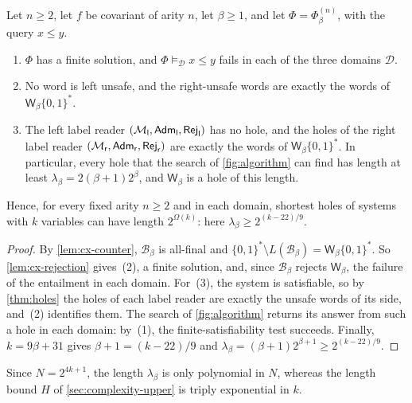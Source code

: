 \begin{proposition}\label{prop:cx-length}
Let $n\ge2$, let $f$ be covariant of arity $n$, let $\beta\ge1$, and let
$\Phi=\Phi_\beta^{(n)}$, with the query $x\le y$.
\begin{enumerate}[leftmargin=*]
\item $\Phi$ has a finite solution, and $\Phi\models_{\mathcal D}x\le y$ fails
  in each of the three domains $\mathcal D$.
\item No word is left unsafe, and the right-unsafe words are exactly the
  words of $\mathsf W_\beta\{0,1\}^*$.
\item The left label reader
  $(\mathcal M_{\mathsf l},\mathsf{Adm}_{\mathsf l},\mathsf{Rej}_{\mathsf l})$ has no hole,
  and the holes of the right label reader
  $(\mathcal M_{\mathsf r},\mathsf{Adm}_{\mathsf r},\mathsf{Rej}_{\mathsf r})$ are exactly the
  words of $\mathsf W_\beta\{0,1\}^*$. In particular, every hole that the
  search of \cref{fig:algorithm} can find has length at least
  $\lambda_\beta=2(\beta+1)2^\beta$, and $\mathsf W_\beta$ is a hole of this
  length.
\end{enumerate}
Hence, for every fixed arity $n\ge2$ and in each domain, shortest holes of
systems with $k$ variables can have length $2^{\Omega(k)}$: here
$\lambda_\beta\ge2^{(k-22)/9}$.
\end{proposition}

\begin{proof}
By \cref{lem:cx-counter}, $\mathcal B_\beta$ is all-final and
$\{0,1\}^*\setminus L(\mathcal B_\beta)=\mathsf W_\beta\{0,1\}^*$. So
\cref{lem:cx-rejection} gives~(2), a finite solution, and, since
$\mathcal B_\beta$ rejects $\mathsf W_\beta$, the failure of the entailment
in each domain. For~(3), the system is satisfiable, so by \cref{thm:holes}
the holes of each label reader are exactly the unsafe words of its side,
and~(2) identifies them. The search of \cref{fig:algorithm} returns its
answer from such a hole in each domain: by~(1), the finite-satisfiability
test succeeds. Finally, $k=9\beta+31$ gives $\beta+1=(k-22)/9$ and
$\lambda_\beta=(\beta+1)2^{\beta+1}\ge2^{(k-22)/9}$.
\end{proof}

Since $N=2^{4k+1}$, the length $\lambda_\beta$ is only polynomial in $N$,
whereas the length bound $H$ of \cref{sec:complexity-upper} is triply
exponential in $k$.

